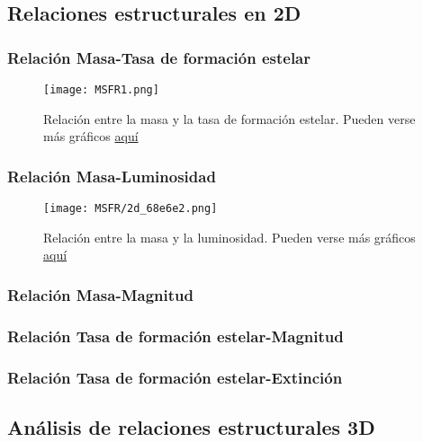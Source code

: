 \documentclass[11pt, a4paper]{article} %
\begin{document}
\subsection{Relaciones estructurales en 2D}

\subsubsection{Relación Masa-Tasa de formación estelar}
\begin{figure}[H]
    \centering
    \texttt{[image: MSFR1.png]}
    \caption{Relación entre la masa y la tasa de formación estelar. Pueden verse más gráficos \href{https://github.com/PhyAMR/TFG/tree/main}{aquí}}
    \label{fig:MSFR}
\end{figure}
\subsubsection{Relación Masa-Luminosidad}

\begin{figure}[H]
    \centering
    \texttt{[image: MSFR/2d\_68e6e2.png]}
    \caption{Relación entre la masa y la luminosidad. Pueden verse más gráficos \href{https://github.com/PhyAMR/TFG/tree/main}{aquí}}
    \label{fig:LM}
\end{figure}
\subsubsection{Relación Masa-Magnitud}
\subsubsection{Relación Tasa de formación estelar-Magnitud}
\subsubsection{Relación Tasa de formación estelar-Extinción}

\subsection{Análisis de relaciones estructurales 3D}
\end{document}
